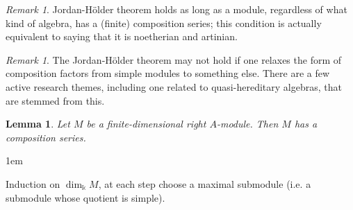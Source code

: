 \documentclass[11pt,a4paper]{article}
\makeatletter
\numberwithin{equation}{section}
\renewenvironment{proof}[1][\proofname]{\par
    \pushQED{\qed}%
    \normalfont \topsep0\p@\@plus6\p@ \labelsep1em\relax
    \trivlist
    \item[\hskip\labelsep\indent
        \bfseries #1]\ignorespaces
    \mbox{}
}{
    \popQED\endtrivlist\@endpefalse
}
\theoremstyle{all}
\newtheorem{lemma}[theorem]{Lemma}
\theoremstyle{remark}
\newtheorem{remark}[theorem]{Remark}
\makeatother
\begin{document}
%

\begin{remark}
Jordan-H\"{o}lder theorem holds as long as a module, regardless of what kind of algebra, has a (finite) composition series; this condition is actually equivalent to saying that it is noetherian and artinian.
\end{remark}

\begin{remark}
The Jordan-H\"{o}lder theorem may not hold if one relaxes the form of composition factors from simple modules to something else.  There are a few active research themes, including one related to quasi-hereditary algebras, that are stemmed from this.
\end{remark}

\begin{lemma}\label{lem:comp series exists}
Let $M$ be a finite-dimensional right $A$-module.
Then $M$ has a composition series.
\end{lemma}
\begin{proof} Induction on $\dim_{\Bbbk} M$, at each step choose a maximal submodule (i.e. a submodule whose quotient is simple).
\end{proof}
\end{document}
